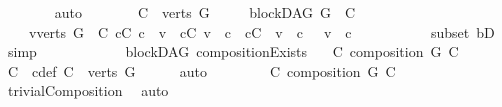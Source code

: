 \begin{isabellebody}
\ \ \ \ \ \ \isamarkupfalse%
\ auto\isanewline
\ \ \ \ \isamarkupfalse%
\ \isamarkupfalse%
\ {\isachardoublequoteopen}C\ {\isasymsubseteq}\ verts\ G\ {\isasymand}\isanewline
\ \ \ \ blockDAG\ {\isacharparenleft}{\kern0pt}G\ {\isasymrestriction}\ C{\isacharparenright}{\kern0pt}\ {\isasymand}\isanewline
\ \ \ \ {\isacharparenleft}{\kern0pt}{\isasymforall}v{\isasymin}verts\ G\ {\isacharminus}{\kern0pt}\ C{\isachardot}{\kern0pt}\ {\isacharparenleft}{\kern0pt}{\isasymforall}c{\isasymin}C{\isachardot}{\kern0pt}\ c\ {\isasymrightarrow}\isactrlsup {\isacharasterisk}{\kern0pt}\ v{\isacharparenright}{\kern0pt}\ {\isasymor}\ {\isacharparenleft}{\kern0pt}{\isasymforall}c{\isasymin}C{\isachardot}{\kern0pt}\ v\ {\isasymrightarrow}\isactrlsup {\isacharasterisk}{\kern0pt}\ c{\isacharparenright}{\kern0pt}\ {\isasymor}\ {\isacharparenleft}{\kern0pt}{\isasymforall}c{\isasymin}C{\isachardot}{\kern0pt}\ {\isasymnot}\ v\ {\isasymrightarrow}\isactrlsup {\isacharasterisk}{\kern0pt}\ c\ {\isasymand}\ {\isasymnot}\ v\ {\isasymrightarrow}\isactrlsup {\isacharasterisk}{\kern0pt}\ c{\isacharparenright}{\kern0pt}{\isacharparenright}{\kern0pt}{\isachardoublequoteclose}\ \isanewline
\ \ \ \ \ \ \ \ \isamarkupfalse%
\ subset\ bD\ \isamarkupfalse%
\ simp\isanewline
\ \ \ \ \isamarkupfalse%
\ \ \isanewline
\ \ \isamarkupfalse%
%
\endisatagproof
{\isafoldproof}%
%
\isadelimproof
\isanewline
%
\endisadelimproof
\isanewline
{}\isamarkupfalse%
\ {\isacharparenleft}{\kern0pt}\ blockDAG{\isacharparenright}{\kern0pt}\ compositionExists{\isacharcolon}{\kern0pt}\isanewline
\ \ \ {\isachardoublequoteopen}{\isasymexists}C{\isachardot}{\kern0pt}\ composition\ G\ C{\isachardoublequoteclose}\isanewline
%
\isadelimproof
%
\endisadelimproof
%
\isatagproof
{}\isamarkupfalse%
\ {\isacharminus}{\kern0pt}\isanewline
\ \ \isamarkupfalse%
\ C\ \ c{\isacharunderscore}{\kern0pt}def{\isacharcolon}{\kern0pt}\ {\isachardoublequoteopen}C\ {\isacharequal}{\kern0pt}\ verts\ G{\isachardoublequoteclose}\isanewline
\ \ \ \ \isamarkupfalse%
\ auto\ \isanewline
\ \ \ \ \isamarkupfalse%
\ \isamarkupfalse%
\ {\isachardoublequoteopen}{\isasymexists}C{\isachardot}{\kern0pt}\ composition\ G\ C{\isachardoublequoteclose}\ \isamarkupfalse%
\ trivialComposition\ \isamarkupfalse%
\ auto\ \isanewline
\ \ \isamarkupfalse%
%
\endisatagproof

\end{isabellebody}
